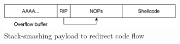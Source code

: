 \begin{figure}[htp!]
    \centering
    \includegraphics[width=0.8\textwidth]{assets/figures/chapter3/payload.pdf}
    \caption{Stack-smashing payload to redirect code flow}
    \label{fig:stack-smashing-payload}
\end{figure}
